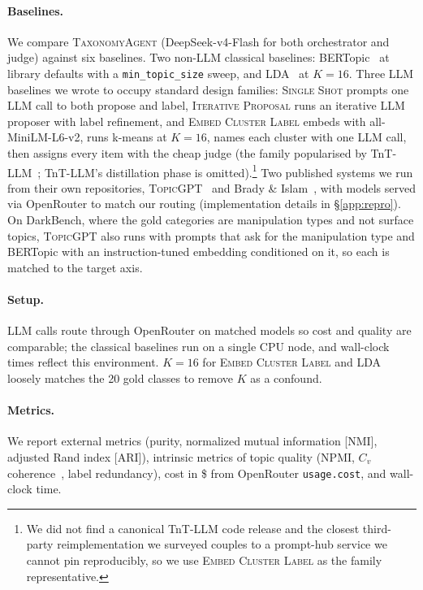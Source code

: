 \paragraph{Baselines.}
We compare \textsc{TaxonomyAgent}
(DeepSeek-v4-Flash for both orchestrator and judge) against six
baselines. Two non-LLM classical baselines:
BERTopic~\citep{grootendorst2022bertopic} at library defaults with a
\texttt{min\_topic\_size} sweep, and LDA~\citep{blei2003lda} at
$K{=}16$. Three LLM baselines we wrote to occupy standard design
families: \textsc{Single Shot} prompts one LLM call to both propose
and label, \textsc{Iterative Proposal} runs an iterative LLM
proposer with label refinement, and \textsc{Embed Cluster Label}
embeds with all-MiniLM-L6-v2, runs k-means at $K{=}16$, names each
cluster with one LLM call, then assigns every item with the cheap
judge (the family popularised by TnT-LLM~\citep{wan2024tntllm};
TnT-LLM's distillation phase is
omitted).\footnote{We did not find a canonical TnT-LLM code release
and the closest third-party reimplementation we surveyed couples to a
prompt-hub service we cannot pin reproducibly, so we use
\textsc{Embed Cluster Label} as the family representative.} Two published systems we run from their own repositories,
\textsc{TopicGPT}~\citep{pham2024topicgpt} and Brady \&
Islam~\citep{brady2025iterativetax}, with models served via OpenRouter
to match our routing (implementation details in \S\ref{app:repro}). On
DarkBench, where the gold categories are manipulation types and not
surface topics, \textsc{TopicGPT} also runs with prompts that ask for
the manipulation type and BERTopic with an instruction-tuned embedding
conditioned on it, so each is matched to the target axis.

\paragraph{Setup.}
LLM calls route through OpenRouter on matched models so cost and quality
are comparable; the classical baselines run on a single CPU node, and
wall-clock times reflect this environment. $K{=}16$ for
\textsc{Embed Cluster Label} and LDA loosely matches the 20 gold classes
to remove $K$ as a confound.

\paragraph{Metrics.}
We report external metrics (purity, normalized mutual information [NMI], adjusted Rand index [ARI]), intrinsic metrics of
topic quality (NPMI, $C_v$ coherence~\citep{rehurek2010gensim},
label redundancy), cost in \$ from OpenRouter \texttt{usage.cost},
and wall-clock time.
